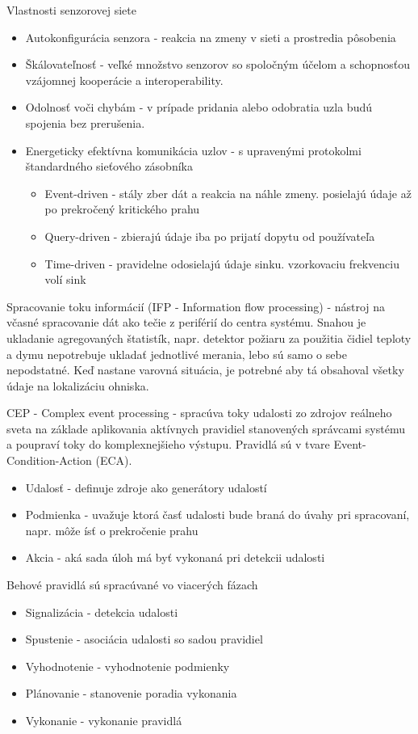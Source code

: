 Vlastnosti senzorovej siete
\begin{itemize}
\itemsep0em 
\item Autokonfigurácia senzora - reakcia na zmeny v sieti a prostredia pôsobenia
\item Škálovateľnosť - veľké množstvo senzorov so spoločným účelom a schopnosťou vzájomnej kooperácie a interoperability.
\item Odolnosť voči chybám - v prípade pridania alebo odobratia uzla budú spojenia bez prerušenia.
\item Energeticky efektívna komunikácia uzlov - s upravenými protokolmi štandardného sieťového zásobníka
\begin{itemize}
\itemsep0em 
\item Event-driven - stály zber dát a reakcia na náhle zmeny. posielajú údaje až po prekročený kritického prahu
\item Query-driven - zbierajú údaje iba po prijatí dopytu od používateľa
\item Time-driven - pravidelne odosielajú údaje sinku. vzorkovaciu frekvenciu volí sink
\end{itemize}
\end{itemize}
\cite{wsn-overview}

Spracovanie toku informácií (IFP - Information flow processing) - nástroj na včasné spracovanie dát ako tečie z periférií do centra systému. Snahou je ukladanie agregovaných štatistík, napr. detektor požiaru za použitia čidiel teploty a dymu nepotrebuje ukladať jednotlivé merania, lebo sú samo o sebe nepodstatné. Keď nastane varovná situácia, je potrebné aby tá obsahoval všetky údaje na lokalizáciu ohniska.

CEP - Complex event processing - spracúva toky udalosti zo zdrojov reálneho sveta na základe aplikovania aktívnych pravidiel stanovených správcami systému a poupraví toky do komplexnejšieho výstupu. Pravidlá sú v tvare Event-Condition-Action (ECA).
\begin{itemize}
\itemsep0em
\item Udalosť - definuje zdroje ako generátory udalostí
\item Podmienka - uvažuje ktorá časť udalosti bude braná do úvahy pri spracovaní, napr. môže ísť o prekročenie prahu
\item Akcia - aká sada úloh má byť vykonaná pri detekcii udalosti
\end{itemize}

Behové pravidlá sú spracúvané vo viacerých fázach
\begin{itemize}
\item Signalizácia - detekcia udalosti
\item Spustenie - asociácia udalosti so sadou pravidiel
\item Vyhodnotenie - vyhodnotenie podmienky
\item Plánovanie - stanovenie poradia vykonania
\item Vykonanie - vykonanie pravidlá
\end{itemize}
\cite{processing-information-flows}

